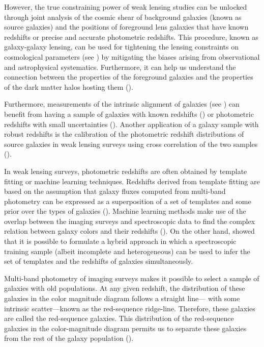 \documentclass[fleqn,usenatbib]{mnras}
\begin{document}
However, the true constraining power of weak lensing studies can be unlocked through joint 
analysis of the cosmic shear of background galaxies (known as source galaxies) and the positions of foreground lens galaxies that have known redshifts or precise and accurate photometric redshifts. This procedure, known as galaxy-galaxy lensing, can be used for tightening the lensing constraints 
on cosmological parameters (see \citealt{elvin2017,joudaki2018,edo2018}) by mitigating the biases arising from observational and astrophysical 
systematics. Furthermore, it can help us understand the connection between the properties of the foreground galaxies and the properties of the dark matter halos hosting them (\citealt{viola2015,edo2016,clampitt2017,dvornik2018}). 

Furthermore, measurements of the intrinsic alignment of galaxies (see \citealt{hirata2004,kirk2015}) can benefit from having a sample of galaxies with known redshifts (\citealt{mandelbaum2011,singh2015,fastsound2017}) or photometric redshifts with small uncertainties (\citealt{joachimi2009,joachimi2010,joachimi2011}). Another application of a galaxy sample with robust redshifts is the calibration of the photometric redshift distributions of source galaxies in weak lensing surveys using cross correlation of the two samples (\citealt{cawthon2017,davis2017,hendrick2017,morrison2017}).

 
In weak lensing surveys, photometric redshifts are often obtained by template fitting or machine learning techniques. Redshifts derived from template fitting are based on the assumption that galaxy fluxes computed from multi-band photometry can be expressed as a superposition of  a set of templates and some prior over the types of galaxies (\citealt{bpz1999,speagle2016,hendrick2017,hoyle2017}). Machine learning methods make use of the overlap between the imaging surveys and spectroscopic data to find the complex relation between galaxy colors and their redshifts (\citealt{masters2015,bonnet2016,kids_annz}). On the other hand, \citealt{boris2017} showed that it is possible to formulate a hybrid approach in which a spectroscopic training sample (albeit incomplete and heterogeneous) can be used to infer the set of templates and the redshifts of galaxies simultaneously.

Multi-band photometry of imaging surveys makes it possible to select a sample of galaxies with old populations. At any given redshift, the distribution of these galaxies in the color magnitude diagram follows a straight line--- with some intrinsic scatter---known as the red-sequence ridge-line. Therefore, these galaxies are called the red-sequence galaxies. This distribution of the red-sequence galaxies in the color-magnitude diagram permits us to separate these galaxies from the rest of the galaxy population (\citealt{gladders_yee2000,hao2009,redmap_sdss,rozo2016}). 
\end{document}
